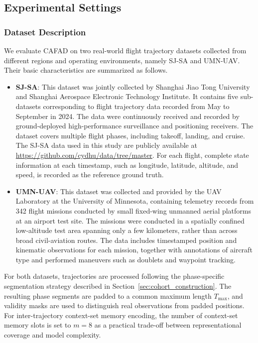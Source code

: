 \documentclass[iicol,pdflatex,sn-basic,Numbered]{sn-jnl}%
\theoremstyle{thmstyleone}%
\theoremstyle{thmstyletwo}%
\theoremstyle{thmstylethree}%
\begin{document}
\subsection{Experimental Settings}

\subsubsection{Dataset Description}
\label{sec:dataset}

We evaluate CAFAD on two real-world flight trajectory datasets collected from different regions and operating environments, namely SJ-SA and UMN-UAV\cite{umn_uav_dataset}.
Their basic characteristics are summarized as follows.

\begin{itemize}
\item \textbf{SJ-SA}: This dataset was jointly collected by Shanghai Jiao Tong University and Shanghai Aerospace Electronic Technology Institute.
It contains five sub-datasets corresponding to flight trajectory data recorded from May to September in 2024.
The data were continuously received and recorded by ground-deployed high-performance surveillance and positioning receivers.
The dataset covers multiple flight phases, including takeoff, landing, and cruise.
The SJ-SA data used in this study are publicly available at \url{https://github.com/cydhu/data/tree/master}.
For each flight, complete state information at each timestamp, such as longitude, latitude, altitude, and speed, is recorded as the reference ground truth.

\item \textbf{UMN-UAV}: This dataset was collected and provided by the UAV Laboratory at the University of Minnesota, containing telemetry records from 342 flight missions conducted by small fixed-wing unmanned aerial platforms at an airport test site.
The missions were conducted in a spatially confined low-altitude test area spanning only a few kilometers, rather than across broad civil-aviation routes.
The data includes timestamped position and kinematic observations for each mission, together with annotations of aircraft type and performed maneuvers such as doublets and waypoint tracking.
\end{itemize}

For both datasets, trajectories are processed following the phase-specific segmentation strategy described in Section~\ref{sec:cohort_construction}.
The resulting phase segments are padded to a common maximum length $T_{\max}$, and validity masks are used to distinguish real observations from padded positions.
For inter-trajectory context-set memory encoding, the number of context-set memory slots is set to $m = 8$ as a practical trade-off between representational coverage and model complexity.
\end{document}
